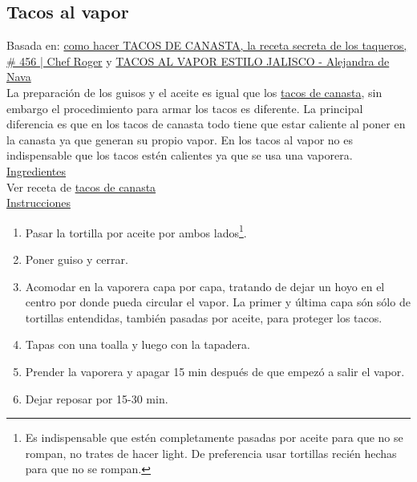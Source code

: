 \subsection{Tacos al vapor}
\label{sec:tacos-al-vapor}

Basada en: \href{https://www.youtube.com/watch?v=kH0nLhOtY2s}{como hacer TACOS DE CANASTA, la receta secreta de los taqueros, \# 456 | Chef Roger} y \href{https://www.youtube.com/watch?v=PoDRiJ3zVmc}{TACOS AL VAPOR ESTILO JALISCO - Alejandra de Nava}\\

La preparación de los guisos y el aceite es igual que los  \hyperref[sec:tacos-de-canasta]{tacos de canasta}, sin embargo el procedimiento para armar los tacos es diferente. La principal diferencia es que en los tacos de canasta todo tiene que estar caliente al poner en la canasta ya que generan su propio vapor. En los tacos al vapor no es indispensable que los tacos estén calientes ya que se usa una vaporera.\\

\underline{Ingredientes}\\
Ver receta de \hyperref[sec:tacos-de-canasta]{tacos de canasta}\\

\underline{Instrucciones}

\begin{enumerate}
\item Pasar la tortilla por aceite por ambos lados\footnote{Es indispensable que estén completamente pasadas por aceite para que no se rompan, no trates de hacer light. De preferencia usar tortillas recién hechas para que no se rompan.}. 
\item Poner guiso y cerrar.
\item Acomodar en la vaporera capa por capa, tratando de dejar un hoyo en el centro por donde pueda circular el vapor. La primer y última capa són sólo de tortillas entendidas, también pasadas por aceite, para proteger los tacos.
\item Tapas con una toalla y luego con la tapadera.
\item Prender la vaporera y apagar 15 min después de que empezó a salir el vapor.
\item Dejar reposar por 15-30 min.
\end{enumerate}

